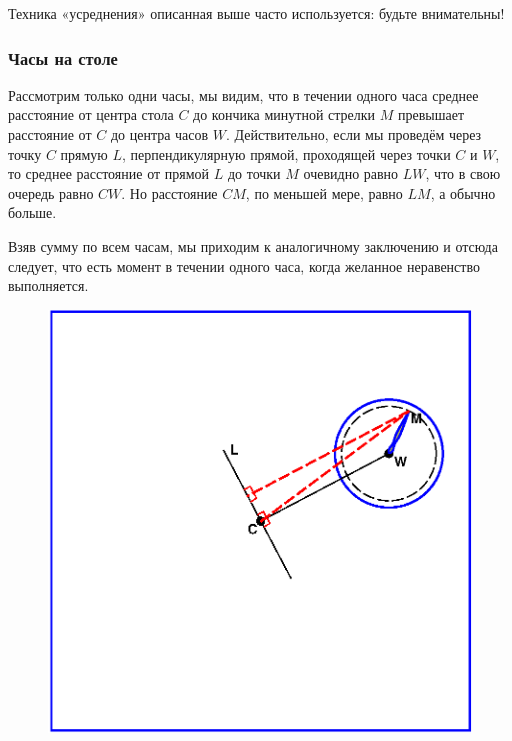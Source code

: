 
Техника «усреднения» описанная выше часто используется: будьте внимательны!

\subsubsection*{Часы на столе} %

Рассмотрим только одни часы, 
мы видим, что в течении одного часа среднее расстояние от центра стола $C$ до кончика минутной стрелки $M$ превышает расстояние от $C$ до центра часов $W$.
Действительно, если мы проведём через точку $C$ прямую $L$, перпендикулярную прямой, проходящей через точки $C$ и $W$, 
то среднее расстояние от прямой $L$ до точки $M$ очевидно равно $LW$, 
что в свою очередь равно $CW$.
Но расстояние $CM$, по меньшей мере, равно $LM$, а обычно больше.

Взяв сумму по всем часам, мы приходим к аналогичному заключению и отсюда следует, что есть момент в течении одного часа, когда желанное неравенство выполняется.\heart

\begin{figure}[h!]
\centering
\includegraphics[scale=0.9]{Figs/Insight/watch}
\end{figure}

